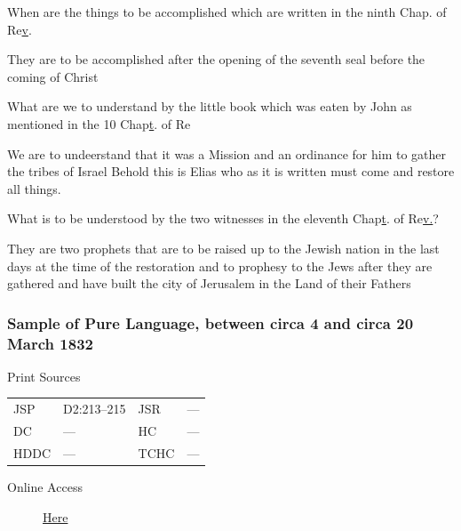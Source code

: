 \begin{compactitem}
				\item[Q] When are the things to be accomplished which are written in the ninth Chap. of Re\uline{v}.
				\item[A] They are to be accomplished after the opening of the seventh seal before the coming of Christ
				\item[Q] What are we to understand by the little book which was eaten by John as mentioned in the 10 Chap\uline{t}. of Re
				\item[A] We are to undeerstand that it was a Mission and an ordinance for him to gather the tribes of Israel Behold this is Elias who as it is written must come and restore all things.
				\item[Q] What is to be understood by the two witnesses in the eleventh Chap\uline{t}. of Re\uline{v.}?
				\item[A] They are two prophets that are to be raised up to the Jewish nation in the last days at the time of the restoration and to prophesy to the Jews after they are gathered and have built the city of Jerusalem in the Land of their Fathers
				\end{compactitem} 
				
		\subsubsection{Sample of Pure Language, between circa 4 and circa 20 March 1832}
			\label{EMS-1832-JS-CIR-4-MAR-1832-LANG}
		
			\begin{description}
				\item[Print Sources]
			\end{description}

				\begin{tabular}{p{0.5in}p{1in}p{0.5in}p{1in}}
				JSP	 	& D2:213--215	& JSR 		& --- \\
				DC	 	& ---	 	& HC 		& --- \\
				HDDC 	& ---		& TCHC 		& --- \\
				\end{tabular}
			
			\begin{description}
				\item[Online Access] \href{https://www.josephsmithpapers.org/paper-summary/sample-of-pure-language-between-circa-4-and-circa-20-march-1832/1}{Here}
			\end{description}
			
